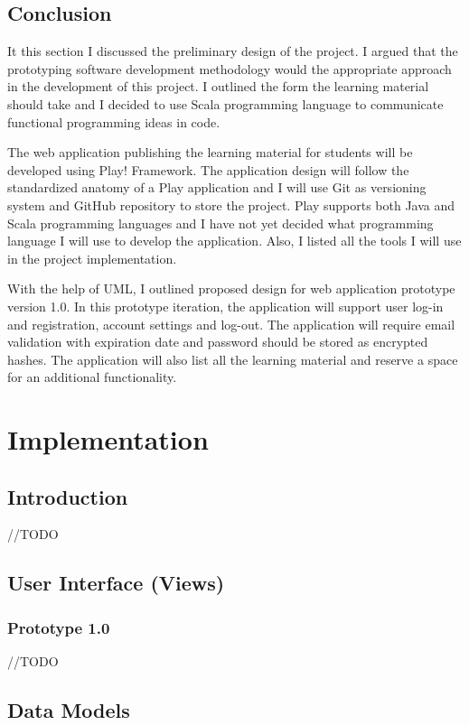 \documentclass[12pt,twoside,a4paper]{report}
\begin{document}
\section{Conclusion}\label{3.11}
It this section I discussed the preliminary design of the project. I argued that the prototyping software development methodology would the appropriate approach in the development of this project. I outlined the form the learning material should take and I decided to use Scala programming language to communicate functional programming ideas in code.

The web application publishing the learning material for students will be developed using Play! Framework. The application design will follow the standardized anatomy of a Play application and I will use Git as versioning system and GitHub repository to store the project. Play supports both Java and Scala programming languages and I have not yet decided what programming language I will use to develop the application. Also, I listed all the tools I will use in the project implementation.

With the help of UML, I outlined proposed design for web application prototype version 1.0. In this prototype iteration, the application will support user log-in and registration, account settings and log-out. The application will require email validation with expiration date and password should be stored as encrypted hashes. The application will also list all the learning material and reserve a space for an additional functionality.
\chapter{Implementation}\label{4}
\section{Introduction}\label{4.1}
//TODO

\section{User Interface (Views)}\label{4.2}
\subsection{Prototype 1.0}\label{4.2.1}
//TODO

\section{Data Models}\label{4.3}
\end{document}
